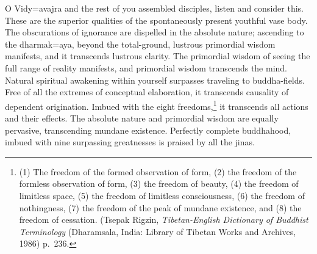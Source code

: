 \documentclass[11pt,twocolumn]{article}
\begin{document}
O Vidy\a={a}vajra and the rest of you assembled disciples, listen and
consider this. These are the superior qualities of the spontaneously
present youthful vase body. The obscurations of ignorance are
dispelled in the absolute nature; ascending to the dharmak\a={a}ya,
beyond the total\hyp{}ground, lustrous primordial wisdom manifests,
and it transcends lustrous clarity. The primordial wisdom of seeing
the full range of reality manifests, and primordial wisdom transcends
the mind. Natural spiritual awakening within yourself surpasses
traveling to buddha\hyp{}fields. Free of all the extremes of
conceptual elaboration, it transcends causality of dependent
origination. Imbued with the eight freedoms,\footnote{(1) The freedom
  of the formed observation of form, (2) the freedom of the formless
  observation of form, (3) the freedom of beauty, (4) the freedom of
  limitless space, (5) the freedom of limitless consciousness, (6) the
  freedom of nothingness, (7) the freedom of the peak of mundane
  existence, and (8) the freedom of cessation. (Tsepak Rigzin,
  \emph{Tibetan\hyp{}English Dictionary of Buddhist Terminology}
  (Dharamsala, India: Library of Tibetan Works and Archives, 1986)
  p.~236.} it transcends all actions and their effects. The absolute
nature and primordial wisdom are equally pervasive, transcending
mundane existence. Perfectly complete buddhahood, imbued with nine
surpassing greatnesses is praised by all the jinas.
\end{document}
